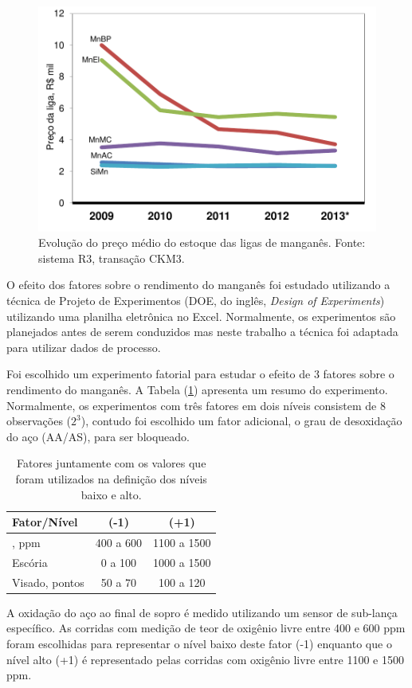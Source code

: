 		\begin{figure}[H]
			\centering
			\includegraphics[scale=0.55, bb=0 0 432 288, trim=0in 0in 0in 0in]{figures/fig03-excel.pdf} %
			\caption{Evolução do preço médio do estoque das ligas de manganês.  Fonte: sistema R3, transação CKM3.}
			\label{fig:evol_custo}
		\end{figure}						
	O efeito dos fatores sobre o rendimento do manganês foi estudado utilizando a técnica de Projeto de Experimentos (DOE, do inglês, \textit{Design of Experiments}) utilizando uma planilha eletrônica no Excel. Normalmente, os experimentos são planejados antes de serem conduzidos mas neste trabalho a técnica foi adaptada para utilizar dados de processo.
	
	Foi escolhido um experimento fatorial para estudar o efeito de 3 fatores sobre o rendimento do manganês. A Tabela (\ref{tab:levels}) apresenta um resumo do experimento. Normalmente, os experimentos com três fatores em dois níveis consistem de 8 observações ($2^3$), contudo foi escolhido um fator adicional, o grau de desoxidação do aço (AA/AS), para ser bloqueado. 
	\begin{table}[H]
	\caption{Fatores juntamente com os valores que foram utilizados na definição dos níveis baixo e alto.}
	\label{tab:levels}
	\begin{center}
		\begin{footnotesize}
			\begin{tabular}{lcc}
				\hline
				Fator/Nível & (-1) & (+1) \\
				\hline \hline
				[O], ppm		&	400 a 600	&	1100 a 1500	\\
				Escória			&	0	a 100	&	1000 a 1500	\\
				Visado, pontos  &	50	a  70	&	 100 a  120	\\
				\hline
			\end{tabular}
		\end{footnotesize}	
	\end{center}
	\end{table}
	A oxidação do aço ao final de sopro é medido utilizando um sensor de sub-lança específico. As corridas com medição de teor de oxigênio livre entre 400 e 600 ppm foram escolhidas para representar o nível baixo  deste fator (-1) enquanto que o nível alto (+1) é representado pelas corridas com oxigênio livre entre 1100 e 1500 ppm.
	
